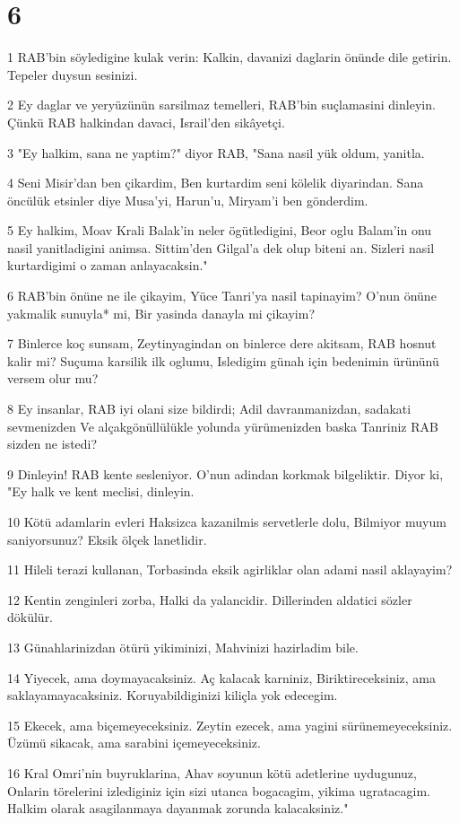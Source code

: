 \chapter{6}

\par 1 RAB'bin söyledigine kulak verin: Kalkin, davanizi daglarin önünde dile getirin. Tepeler duysun sesinizi.
\par 2 Ey daglar ve yeryüzünün sarsilmaz temelleri, RAB'bin suçlamasini dinleyin. Çünkü RAB halkindan davaci, Israil'den sikâyetçi.
\par 3 "Ey halkim, sana ne yaptim?" diyor RAB, "Sana nasil yük oldum, yanitla.
\par 4 Seni Misir'dan ben çikardim, Ben kurtardim seni kölelik diyarindan. Sana öncülük etsinler diye Musa'yi, Harun'u, Miryam'i ben gönderdim.
\par 5 Ey halkim, Moav Krali Balak'in neler ögütledigini, Beor oglu Balam'in onu nasil yanitladigini animsa. Sittim'den Gilgal'a dek olup biteni an. Sizleri nasil kurtardigimi o zaman anlayacaksin."
\par 6 RAB'bin önüne ne ile çikayim, Yüce Tanri'ya nasil tapinayim? O'nun önüne yakmalik sunuyla* mi, Bir yasinda danayla mi çikayim?
\par 7 Binlerce koç sunsam, Zeytinyagindan on binlerce dere akitsam, RAB hosnut kalir mi? Suçuma karsilik ilk oglumu, Isledigim günah için bedenimin ürününü versem olur mu?
\par 8 Ey insanlar, RAB iyi olani size bildirdi; Adil davranmanizdan, sadakati sevmenizden Ve alçakgönüllülükle yolunda yürümenizden baska Tanriniz RAB sizden ne istedi?
\par 9 Dinleyin! RAB kente sesleniyor. O'nun adindan korkmak bilgeliktir. Diyor ki, "Ey halk ve kent meclisi, dinleyin.
\par 10 Kötü adamlarin evleri Haksizca kazanilmis servetlerle dolu, Bilmiyor muyum saniyorsunuz? Eksik ölçek lanetlidir.
\par 11 Hileli terazi kullanan, Torbasinda eksik agirliklar olan adami nasil aklayayim?
\par 12 Kentin zenginleri zorba, Halki da yalancidir. Dillerinden aldatici sözler dökülür.
\par 13 Günahlarinizdan ötürü yikiminizi, Mahvinizi hazirladim bile.
\par 14 Yiyecek, ama doymayacaksiniz. Aç kalacak karniniz, Biriktireceksiniz, ama saklayamayacaksiniz. Koruyabildiginizi kiliçla yok edecegim.
\par 15 Ekecek, ama biçemeyeceksiniz. Zeytin ezecek, ama yagini sürünemeyeceksiniz. Üzümü sikacak, ama sarabini içemeyeceksiniz.
\par 16 Kral Omri'nin buyruklarina, Ahav soyunun kötü adetlerine uydugunuz, Onlarin törelerini izlediginiz için sizi utanca bogacagim, yikima ugratacagim. Halkim olarak asagilanmaya dayanmak zorunda kalacaksiniz."


